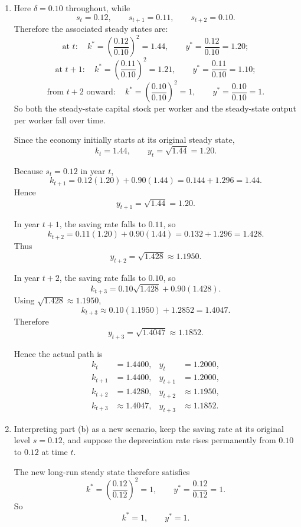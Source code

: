\documentclass[12pt]{article}
\begin{document}
\begin{enumerate}[label=(\alph*)]
    \item
    Here \(\delta=0.10\) throughout, while
    \[
    s_t=0.12,\qquad s_{t+1}=0.11,\qquad s_{t+2}=0.10.
    \]
    Therefore the associated steady states are:
    \[
    \text{at }t:\quad
    k^*=\left(\frac{0.12}{0.10}\right)^2=1.44,
    \qquad
    y^*=\frac{0.12}{0.10}=1.20;
    \]
    \[
    \text{at }t+1:\quad
    k^*=\left(\frac{0.11}{0.10}\right)^2=1.21,
    \qquad
    y^*=\frac{0.11}{0.10}=1.10;
    \]
    \[
    \text{from }t+2\text{ onward}:\quad
    k^*=\left(\frac{0.10}{0.10}\right)^2=1,
    \qquad
    y^*=\frac{0.10}{0.10}=1.
    \]
    So both the steady-state capital stock per worker and the steady-state output per worker fall over time.

    Since the economy initially starts at its original steady state,
    \[
    k_t=1.44,
    \qquad
    y_t=\sqrt{1.44}=1.20.
    \]

    Because \(s_t=0.12\) in year \(t\),
    \[
    k_{t+1}=0.12(1.20)+0.90(1.44)=0.144+1.296=1.44.
    \]
    Hence
    \[
    y_{t+1}=\sqrt{1.44}=1.20.
    \]

    In year \(t+1\), the saving rate falls to \(0.11\), so
    \[
    k_{t+2}=0.11(1.20)+0.90(1.44)=0.132+1.296=1.428.
    \]
    Thus
    \[
    y_{t+2}=\sqrt{1.428}\approx 1.1950.
    \]

    In year \(t+2\), the saving rate falls to \(0.10\), so
    \[
    k_{t+3}=0.10\sqrt{1.428}+0.90(1.428).
    \]
    Using \(\sqrt{1.428}\approx 1.1950\),
    \[
    k_{t+3}\approx 0.10(1.1950)+1.2852=1.4047.
    \]
    Therefore
    \[
    y_{t+3}=\sqrt{1.4047}\approx 1.1852.
    \]

    Hence the actual path is
    \[
    \boxed{
    \begin{aligned}
    k_t&=1.4400, & y_t&=1.2000,\\
    k_{t+1}&=1.4400, & y_{t+1}&=1.2000,\\
    k_{t+2}&=1.4280, & y_{t+2}&\approx 1.1950,\\
    k_{t+3}&\approx 1.4047, & y_{t+3}&\approx 1.1852.
    \end{aligned}}
    \]

    \item
    Interpreting part (b) as a new scenario, keep the saving rate at its original level \(s=0.12\), and suppose the depreciation rate rises permanently from \(0.10\) to \(0.12\) at time \(t\).

    The new long-run steady state therefore satisfies
    \[
    k^*=\left(\frac{0.12}{0.12}\right)^2=1,
    \qquad
    y^*=\frac{0.12}{0.12}=1.
    \]
    So
    \[
    \boxed{k^*=1,\qquad y^*=1.}
    \]


\end{enumerate}
\end{document}
